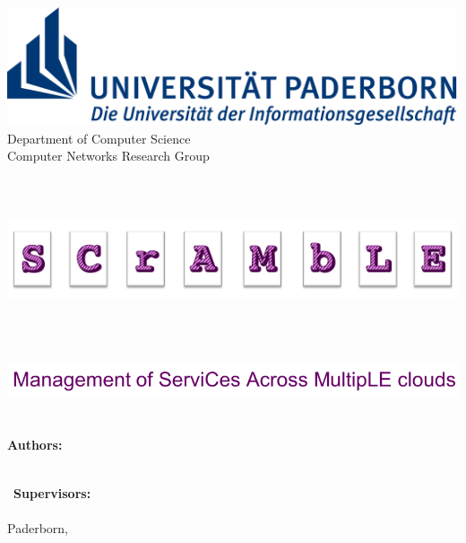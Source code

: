 
\begin{titlepage}	
	\begin{center}
		\begin{minipage}{135mm}
			\centering
			\includegraphics[height=35mm]{figures/uni-logo}			
			\textsf{
				\hspace*{8mm} 
				\Large Department of Computer Science\\
				\hspace*{8mm} Computer Networks Research Group \\
			}		
		\end{minipage}\\[40pt]
		
		
		

		{\Huge\textbf{\thetitle{}}}

	\begin{minipage}{3000mm}
	\hspace*{-1.3cm} 
	\includegraphics[height=30mm]{figures/CuK-Logo2_rot}
\end{minipage}\\[10pt]

\begin{minipage}{3000mm}
	\hspace*{-1cm} 
	\includegraphics[height=13.5mm]{figures/subtitle}
\end{minipage}\\[10pt]

		\huge \centering \textbf{Authors:} \vspace{4mm}
	
		{\huge \textsc{\theauthor{}}}\\[30pt]

		\ \textbf{Supervisors:}\\
		
		{\huge \textsc \thesupervisor{}}\\[30pt]

		Paderborn, \thesubmissiondate{}
	\end{center}
\end{titlepage}


